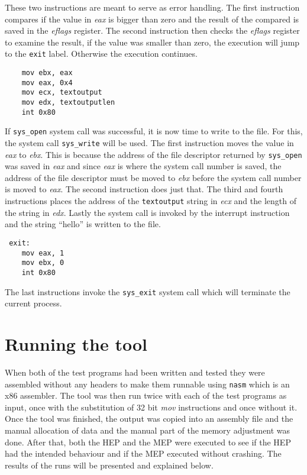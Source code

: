 \documentclass[11pt,twoside]{eitExjobb}
\begin{document}
These two instructions are meant to serve as error handling. The first instruction compares if the value in \emph{eax} is bigger than zero and the result of the compared is saved in the \emph{eflags} register. The second instruction then checks the \emph{eflags} register to examine the result, if the value was smaller than zero, the execution will jump to the \texttt{exit} label. Otherwise the execution continues.

\begin{verbatim}
    mov ebx, eax
    mov eax, 0x4
    mov ecx, textoutput
    mov edx, textoutputlen
    int 0x80
\end{verbatim}

\noindent If \texttt{sys\_open} system call was successful, it is now time to write to the file. For this, the system call \texttt{sys\_write} will be used. The first instruction moves the value in \emph{eax} to \emph{ebx}. This is because the address of the file descriptor returned by \texttt{sys\_open} was saved in \emph{eax} and since \emph{eax} is where the system call number is saved, the address of the file descriptor must be moved to \emph{ebx} before the system call number is moved to \emph{eax}. The second instruction does just that. The third and fourth instructions places the address of the \texttt{textoutput} string in \emph{ecx} and the length of the string in \emph{edx}. Lastly the system call is invoked by the interrupt instruction and the string ``hello'' is written to the file.

\begin{verbatim}
 exit:
    mov eax, 1
    mov ebx, 0	
    int 0x80
\end{verbatim}

\noindent The last instructions invoke the \texttt{sys\_exit} system call which will terminate the current process. 

\section{Running the tool}
When both of the test programs had been written and tested they were assembled without any headers to make them runnable using \texttt{nasm}\cite{nasm} which is an x86 assembler. The tool was then run twice with each of the test programs as input, once with the substitution of 32 bit \emph{mov} instructions and once without it. Once the tool was finished, the output was copied into an assembly file and the manual allocation of data and the manual part of the memory adjustment was done. After that, both the HEP and the MEP were executed to see if the HEP had the intended behaviour and if the MEP executed without crashing. The results of the runs will be presented and explained below.
\end{document}

